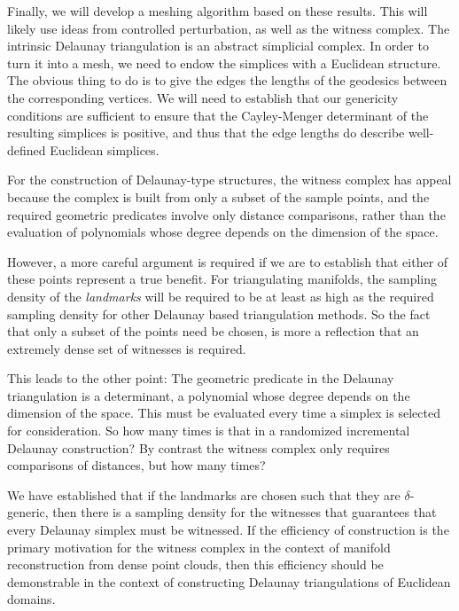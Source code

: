 Finally, we will develop a meshing algorithm based on these
results. This will likely use ideas from controlled perturbation, as
well as the witness complex. The intrinsic Delaunay triangulation is
an abstract simplicial complex. In order to turn it into a mesh, we
need to endow the simplices with a Euclidean structure. The obvious
thing to do is to give the edges the lengths of the geodesics between
the corresponding vertices. We will need to establish that our
genericity conditions are sufficient to ensure that the Cayley-Menger
determinant of the resulting simplices is positive, and thus that the
edge lengths do describe well-defined Euclidean simplices.


%

For the construction of Delaunay-type structures, the witness complex
has appeal because the complex is built from only a subset of the
sample points, and the required geometric predicates involve only
distance comparisons, rather than the evaluation of polynomials whose
degree depends on the dimension of the space. 

However, a more careful argument is required if we are to establish
that either of these points represent a true benefit. For
triangulating manifolds, the sampling density of the \emph{landmarks}
will be required to be at least as high as the required sampling
density for other Delaunay based triangulation methods. So the fact
that only a subset of the points need be chosen, is more a reflection
that an extremely dense set of witnesses is required.

This leads to the other point: The geometric predicate in the Delaunay
triangulation is a determinant, a polynomial whose degree depends on
the dimension of the space. This must be evaluated every time a
simplex is selected for consideration. So how many times is that in a
randomized incremental Delaunay construction? By contrast the witness
complex only requires comparisons of distances, but how many times?

We have established that if the landmarks are chosen such that they
are $\delta$-generic, then there is a sampling density for the
witnesses that guarantees that every Delaunay simplex must be
witnessed. If the efficiency of construction is the primary motivation
for the witness complex in the context of manifold reconstruction from
dense point clouds, then this efficiency should be demonstrable in the
context of constructing Delaunay triangulations of Euclidean domains.

